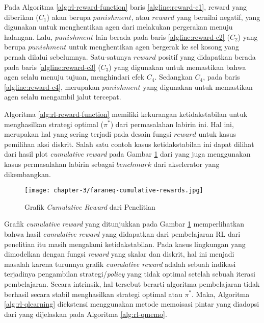 Pada Algoritma \ref{alg:rl-reward-function} baris \ref{algline:reward-c1}, reward yang diberikan ($C_1$) akan berupa $punishment$, atau $reward$ yang bernilai negatif, yang digunakan untuk menghentikan agen dari melakukan pergerakan menuju halangan. Lalu, $punishment$ lain berada pada baris \ref{algline:reward-c2} ($C_2$) yang berupa $punishment$ untuk menghentikan agen bergerak ke sel kosong yang pernah dilalui sebelumnya. Satu-satunya $reward$ positif yang didapatkan berada pada baris \ref{algline:reward-c3} ($C_3$) yang digunakan untuk memastikan bahwa agen selalu menuju tujuan, menghindari efek $C_4$. Sedangkan $C_4$, pada baris \ref{algline:reward-c4}, merupakan $punishment$ yang digunakan untuk memastikan agen selalu mengambil jalut tercepat.

Algoritma \ref{alg:rl-reward-function} memiliki kekurangan ketidakstabilan untuk menghasilkan strategi optimal ($\pi^*$) dari permasalahan labirin ini. Hal ini, merupakan hal yang sering terjadi pada desain fungsi $reward$ untuk kasus pemilihan aksi diskrit. Salah satu contoh kasus ketidakstabilan ini dapat dilihat dari hasil plot \textit{cumulative reward} pada Gambar \ref{fig:cumulative-reward-faraneq} dari \parencite{sutisna2023faraneq} yang juga menggunakan kasus permasalahan labirin sebagai $benchmark$ dari akselerator yang dikembangkan.

\begin{figure}[H]
	\centering
	\texttt{[image: chapter-3/faraneq-cumulative-rewards.jpg]}
	\caption{Grafik \textit{Cumulative Reward} dari Penelitian \parencite{sutisna2023faraneq}}
	\label{fig:cumulative-reward-faraneq}
\end{figure}

Grafik \textit{cumulative reward} yang ditunjukkan pada Gambar \ref{fig:cumulative-reward-faraneq} memperlihatkan bahwa hasil \textit{cumulative reward} yang didapatkan dari pembelajaran \ac{RL} dari penelitian \parencite{sutisna2023faraneq} itu masih mengalami ketidakstabilan. Pada kasus lingkungan yang dimodelkan dengan fungsi \textit{reward} yang skalar dan diskrit, hal ini menjadi masalah karena turunnya grafik \textit{cumulative reward} adalah sebuah indikasi terjadinya pengambilan strategi/\textit{policy} yang tidak optimal setelah sebuah iterasi pembelajaran. Secara intrinsik, hal tersebut berarti algoritma pembelajaran tidak berhasil secara stabil menghasilkan strategi optimal atau $\pi^*$. Maka, Algoritma \ref{alg:rl-qlearning} diekstensi menggunakan metode memoisasi pintar yang diadopsi dari \parencite{mazaya2024reinforcement} yang dijelaskan pada Algoritma \ref{alg:rl-qmemo}.


